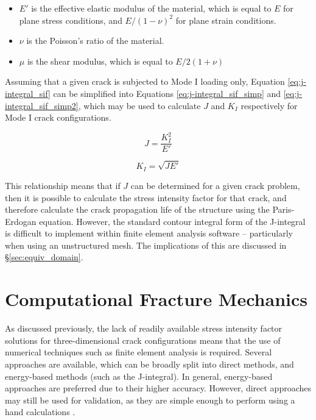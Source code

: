 \begin{itemize}
	\item $E'$ is the effective elastic modulus of the material, which is equal to $E$ for plane stress conditions, and ${E}/{(1 - \nu)^2}$ for plane strain conditions.
	\item $\nu$ is the Poisson's ratio of the material.
	\item $\mu$ is the shear modulus, which is equal to ${E}/{2(1+\nu)}$
\end{itemize}

Assuming that a given crack is subjected to Mode I loading only, Equation \ref{eq:j-integral_sif} can be simplified into Equations \ref{eq:j-integral_sif_simp} and \ref{eq:j-integral_sif_simp2}, which may be used to calculate $J$ and $K_{I}$ respectively for Mode I crack configurations.

\begin{equation}
	J = \frac{K_I^2 }{E'}
	\label{eq:j-integral_sif_simp}
\end{equation}

\begin{equation}
	{K_I } = \sqrt{J E'}
	\label{eq:j-integral_sif_simp2}
\end{equation}

This relationship means that if $J$ can be determined for a given crack problem, then it is possible to calculate the stress intensity factor for that crack, and therefore calculate the crack propagation life of the structure using the Paris-Erdogan equation. However, the standard contour integral form of the J-integral is difficult to implement within finite element analysis software -- particularly when using an unstructured mesh. The implications of this are discussed in \S\ref{sec:equiv_domain}.
	
\newpage
\section{Computational Fracture Mechanics}\label{sec:comp_fracture}

As discussed previously, the lack of readily available stress intensity factor solutions for three-dimensional crack configurations means that the use of numerical techniques such as finite element analysis is required. Several approaches are available, which can be broadly split into direct methods, and energy-based methods (such as the J-integral). In general, energy-based approaches are preferred due to their higher accuracy. However, direct approaches may still be used for validation, as they are simple enough to perform using a hand calculations \cite{milne_numerical_2003}.


